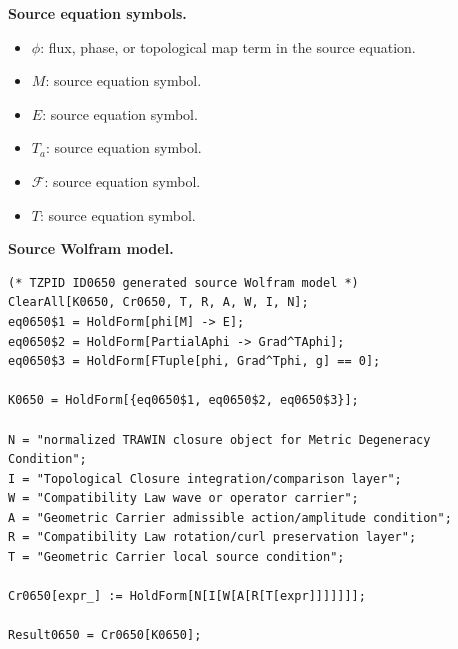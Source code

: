 \begin{minipage}[t]{0.49\linewidth}
\begingroup
\small
\raggedright
\textbf{Source equation symbols.}\par
\begin{itemize}[leftmargin=1.35em,itemsep=1pt,topsep=1pt,parsep=0pt]
    \item $\phi$: flux, phase, or topological map term in the source equation.
    \item $M$: source equation symbol.
    \item $E$: source equation symbol.
    \item $T_a$: source equation symbol.
    \item $\mathcal{F}$: source equation symbol.
    \item $T$: source equation symbol.
\end{itemize}
\endgroup
\end{minipage}\hfill
\begin{minipage}[t]{0.47\linewidth}
\begingroup
\scriptsize
\raggedright
\textbf{Source Wolfram model.}\par
\begin{Verbatim}[fontsize=\tiny,breaklines=true,breakanywhere=true]
(* TZPID ID0650 generated source Wolfram model *)
ClearAll[K0650, Cr0650, T, R, A, W, I, N];
eq0650$1 = HoldForm[phi[M] -> E];
eq0650$2 = HoldForm[PartialAphi -> Grad^TAphi];
eq0650$3 = HoldForm[FTuple[phi, Grad^Tphi, g] == 0];

K0650 = HoldForm[{eq0650$1, eq0650$2, eq0650$3}];

N = "normalized TRAWIN closure object for Metric Degeneracy Condition";
I = "Topological Closure integration/comparison layer";
W = "Compatibility Law wave or operator carrier";
A = "Geometric Carrier admissible action/amplitude condition";
R = "Compatibility Law rotation/curl preservation layer";
T = "Geometric Carrier local source condition";

Cr0650[expr_] := HoldForm[N[I[W[A[R[T[expr]]]]]]];

Result0650 = Cr0650[K0650];
\end{Verbatim}
\endgroup
\end{minipage}


